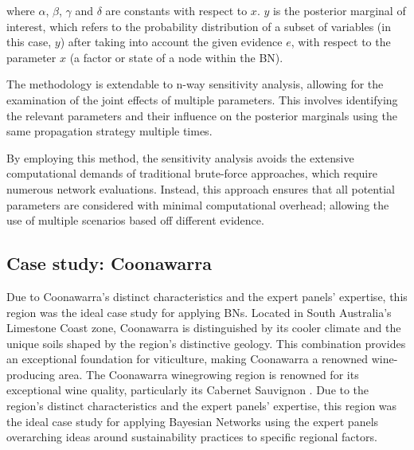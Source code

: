 where $\alpha$, $\beta$, $\gamma$ and $\delta$ are constants with respect to $x$. $y$ is the posterior marginal of interest, which refers to the probability distribution of a subset of variables (in this case, $y$) after taking into account the given evidence $e$, with respect to the parameter $x$ (a factor or state of a node within the BN).








The methodology is extendable to n-way sensitivity analysis, allowing for the examination of the joint effects of multiple parameters. This involves identifying the relevant parameters and their influence on the posterior marginals using the same propagation strategy multiple times.

By employing this method, the sensitivity analysis avoids the extensive computational demands of traditional brute-force approaches, which require numerous network evaluations. Instead, this approach ensures that all potential parameters are considered with minimal computational overhead; allowing the use of multiple scenarios based off different evidence.

\subsection{Case study: Coonawarra}

Due to Coonawarra's distinct characteristics and the expert panels' expertise, this region was the ideal case study for applying BNs. Located in South Australia's Limestone Coast zone, Coonawarra is distinguished by its cooler climate and the unique soils shaped by the region's distinctive geology. This combination provides an exceptional foundation for viticulture, making Coonawarra a renowned wine-producing area. The Coonawarra winegrowing region is renowned for its exceptional wine quality, particularly its Cabernet Sauvignon \cite{hallidayAustralianWineEncyclopedia2009}. Due to the region's distinct characteristics and the expert panels' expertise, this region was the ideal case study for applying Bayesian Networks using the expert panels overarching ideas around sustainability practices to specific regional factors.

